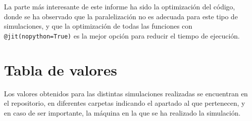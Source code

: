 \documentclass[11pt, twoside]{article} %
\begin{document}
La parte más interesante de este informe ha sido la optimización del código, donde se ha
observado que la paralelización no es adecuada para este tipo de simulaciones, y que la
optimización de todas las funciones con \texttt{@jit(nopython=True)} es la mejor opción
para reducir el tiempo de ejecución.



\newpage

\appendix

\section{Tabla de valores}

Los valores obtenidos para las distintas simulaciones realizadas se encuentran en el
repositorio, en diferentes carpetas indicando el apartado al que pertenecen, y en caso
de ser importante, la máquina en la que se ha realizado la simulación.
\end{document}
